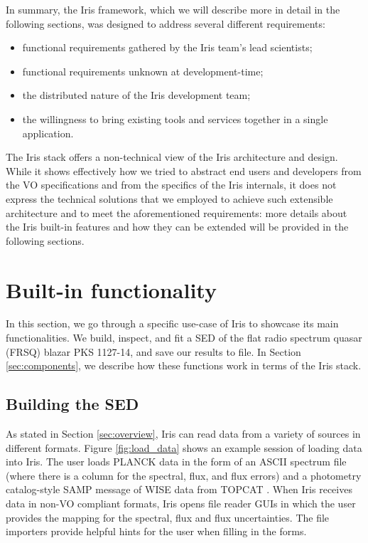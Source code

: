 \documentclass[5p]{elsarticle}
\begin{document}
In summary, the Iris framework, which we will describe more in detail in the following sections, was designed to address several different requirements:
\begin{itemize}
\item functional requirements gathered by the Iris team's lead scientists;
\item functional requirements unknown at development-time;
\item the distributed nature of the Iris development team;
\item the willingness to bring existing tools and services together in a single application.
\end{itemize}

The Iris stack offers a non-technical view of the Iris architecture and design. While it shows effectively how we tried to abstract end users and developers from the VO specifications and from the specifics of the Iris internals, it does not express the technical solutions that we employed to achieve such extensible architecture and to meet the aforementioned requirements: more details about the Iris built-in features and how they can be extended will be provided in the following sections.

\section{Built-in functionality}
\label{sec:builtin}

In this section, we go through a specific use-case of Iris to showcase its main functionalities. We build, inspect, and fit a SED of the flat radio spectrum quasar (FRSQ) blazar PKS 1127-14, and save our results to file. In Section \ref{sec:components}, we describe how these functions work in terms of the Iris stack.

\subsection{Building the SED}

As stated in Section \ref{sec:overview}, Iris can read data from a variety of sources in different formats. Figure \ref{fig:load_data} shows an example session of loading data into Iris. The user loads PLANCK data in the form of an ASCII spectrum file (where there is a column for the spectral, flux, and flux errors) and a photometry catalog-style SAMP message of WISE data from TOPCAT \citep{2005ASPC..347...29T}. When Iris receives data in non-VO compliant formats, Iris opens file reader GUIs in which the user provides the mapping for the spectral, flux and flux uncertainties. The file importers provide helpful hints for the user when filling in the forms.
\end{document}
